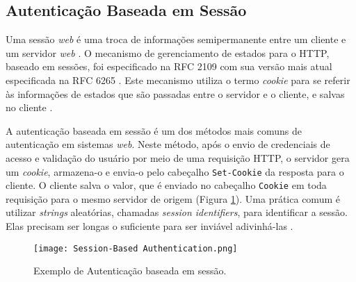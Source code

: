 \subsection{Autenticação Baseada em Sessão}

Uma sessão \emph{web} é uma troca de informações semipermanente entre um cliente e um servidor \emph{web} 
\cite{CALZAVARA2017}. O mecanismo de gerenciamento de estados para o HTTP, baseado em sessões, foi 
especificado na RFC 2109 \cite{RFC2109} com sua versão mais atual especificada na RFC 6265 
\cite{RFC6265}. Este mecanismo utiliza o termo \emph{cookie} para se referir às informações de 
estados que são passadas entre o servidor e o cliente, e salvas no cliente \cite{RFC2109}. 

A autenticação baseada em sessão é um dos métodos mais comuns de autenticação em sistemas \emph{web}. 
Neste método, após o envio de credenciais de acesso e validação do usuário por meio de uma requisição 
HTTP, o servidor gera um \emph{cookie}, armazena-o e envia-o pelo cabeçalho \texttt{Set-Cookie} da 
resposta para o cliente. O cliente salva o valor, que é enviado no cabeçalho \texttt{Cookie} em 
toda requisição para o mesmo servidor de origem \cite{PAPATHANASAKI2022} 
(Figura \ref{fig:sessionAuth}). Uma prática comum é utilizar \emph{strings} aleatórias, chamadas 
\emph{session identifiers}, para identificar a sessão. Elas precisam ser longas o suficiente para 
ser inviável adivinhá-las \cite{DRHOVA2018}.

\begin{figure}[ht]
  \centering
  \texttt{[image: Session-Based Authentication.png]}
  \caption{Exemplo de Autenticação baseada em sessão.}
  \label{fig:sessionAuth}
\end{figure}

\

\